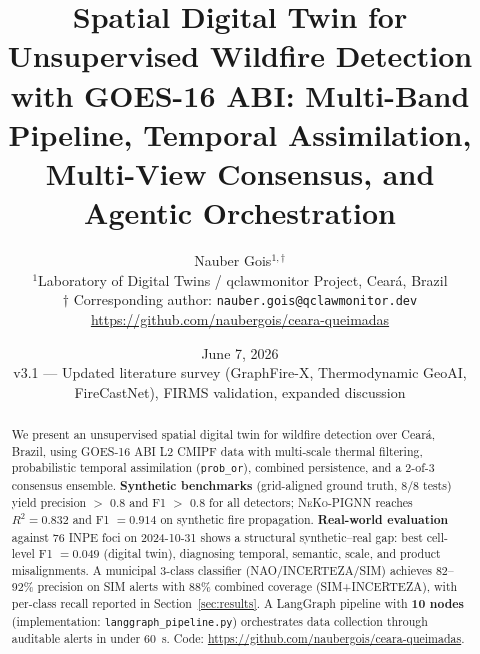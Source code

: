 \documentclass[5p,twocolumn]{elsarticle}
\title{\Large\textbf{Spatial Digital Twin for Unsupervised Wildfire Detection\\[4pt]
with GOES-16 ABI: Multi-Band Pipeline, Temporal Assimilation,\\[4pt]
Multi-View Consensus, and Agentic Orchestration}}
\author{Nauber Gois$^{1,\dagger}$ \\
\small $^{1}$Laboratory of Digital Twins / qclawmonitor Project, Cear\'{a}, Brazil \\
\small $\dagger$ Corresponding author: \texttt{nauber.gois@qclawmonitor.dev} \\
\small \url{https://github.com/naubergois/ceara-queimadas}}
\date{June 7, 2026\vspace{4pt}\\
\small v3.1 --- Updated literature survey (GraphFire-X, Thermodynamic GeoAI,
FireCastNet), FIRMS validation, expanded discussion}
\newcommand{\code}[1]{\texttt{#1}}
\newcommand{\abbrev}[1]{{\small\textsc{#1}}}
\begin{document}
\maketitle

\begin{abstract}
We present an unsupervised spatial digital twin for wildfire detection over Cear\'{a}, Brazil, using \abbrev{GOES-16} \abbrev{ABI} L2 \abbrev{CMIPF} data with multi-scale thermal filtering, probabilistic temporal assimilation (\code{prob\_or}), combined persistence, and a 2-of-3 consensus ensemble. \textbf{Synthetic benchmarks} (grid-aligned ground truth, 8/8 tests) yield precision $>$ 0.8 and F1 $>$ 0.8 for all detectors; \abbrev{NeKo-PIGNN} reaches $R^2=0.832$ and F1 $=0.914$ on synthetic fire propagation. \textbf{Real-world evaluation} against 76 \abbrev{INPE} foci on 2024-10-31 shows a structural synthetic--real gap: best cell-level F1 $=0.049$ (digital twin), diagnosing temporal, semantic, scale, and product misalignments. A municipal 3-class classifier (\abbrev{NAO}/\abbrev{INCERTEZA}/\abbrev{SIM}) achieves 82--92\% precision on \abbrev{SIM} alerts with 88\% combined coverage (\abbrev{SIM}+\abbrev{INCERTEZA}), with per-class recall reported in Section~\ref{sec:results}. A LangGraph pipeline with \textbf{10 nodes} (implementation: \texttt{langgraph\_pipeline.py}) orchestrates data collection through auditable alerts in under 60~s. Code: \url{https://github.com/naubergois/ceara-queimadas}.
\end{abstract}
\end{document}
